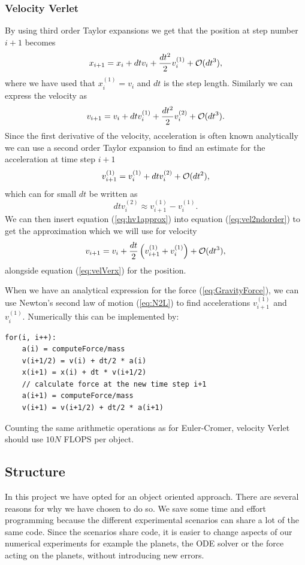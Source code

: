 \documentclass[norsk,a4paper,12pt]{article}
\begin{document}
{\subsubsection{Velocity Verlet}
By using third order Taylor expansions we get that the position at step number $i+1$ becomes \begin{equation}
x_{i+1} = x_i + dt v_i + \frac{dt^2}{2}v_i^{(1)} + {\cal O}(dt^3),
\label{eq:velVerx}
\end{equation}
where we have used that $x_i^{(1)} = v_i$ and $dt$ is the step length. Similarly we can express the velocity as
\begin{equation}
v_{i+1} = v_i + dt v_i^{(1)} + \frac{dt^2}{2}v_i^{(2)} + {\cal O}(dt^3).
\label{eq:vel2ndorder}
\end{equation}
Since the first derivative of the velocity, acceleration is often known analytically we can use a second order Taylor expansion to find an estimate for the acceleration at time step $i+1$
$$v_{i+1}^{(1)} = v_i^{(1)} + dtv_i^{(2)} + {\cal O}(dt^2), $$
which can for small $dt$ be written as 
\begin{equation}
dtv_i^{(2)} \approx v_{i+1}^{(1)}- v_i^{(1)}.
\label{eq:hv1approx}
\end{equation}
We can then insert equation (\ref{eq:hv1approx}) into equation (\ref{eq:vel2ndorder}) to get the approximation which we will use for velocity
\begin{equation}
v_{i+1} = v_i + \frac{dt}{2}\left(v_{i+1}^{(1)} + v_i^{(1)}\right) + {\cal O}(dt^3),
\label{eq:velVerv}
\end{equation}
alongside equation (\ref{eq:velVerx}) for the position. 

When we have an analytical expression for the force (\ref{eq:GravityForce}), we can use Newton's second law of motion (\ref{eq:N2L}) to find accelerations $v_{i+1}^{(1)}$ and $v_{i}^{(1)}$. Numerically this can be implemented by:
\begin{lstlisting}
for(i, i++):
	a(i) = computeForce/mass
	v(i+1/2) = v(i) + dt/2 * a(i)
	x(i+1) = x(i) + dt * v(i+1/2)
	// calculate force at the new time step i+1
	a(i+1) = computeForce/mass
	v(i+1) = v(i+1/2) + dt/2 * a(i+1)
\end{lstlisting}
Counting the same arithmetic operations as for Euler-Cromer, velocity Verlet should use $10N$ FLOPS per object.
\subsection{Structure}
In this project we have opted for an object oriented approach. There are several reasons for why we have chosen to do so. We save some time and effort programming because the different experimental scenarios can share a lot of the same code. Since the scenarios share code, it is easier to change aspects of our numerical experiments for example the planets, the ODE solver or the force acting on the planets, without introducing new errors. 

}
\end{document}
